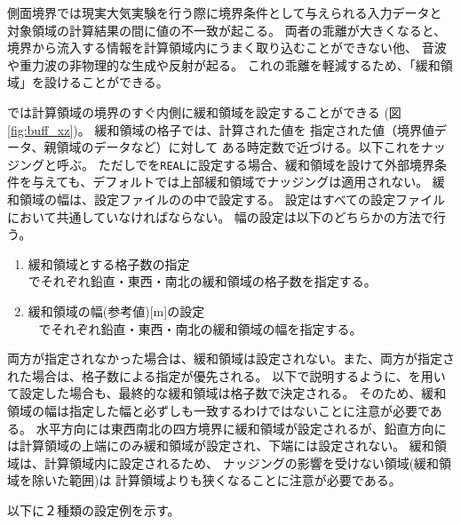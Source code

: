 側面境界では現実大気実験を行う際に境界条件として与えられる入力データと
対象領域の計算結果の間に値の不一致が起こる。
両者の乖離が大きくなると、境界から流入する情報を計算領域内にうまく取り込むことができない他、
音波や重力波の非物理的な生成や反射が起る。
これの乖離を軽減するため、「緩和領域」を設けることができる。

\scalerm では計算領域の境界のすぐ内側に緩和領域を設定することができる
(図\ref{fig:buff_xz})。
緩和領域の格子では、計算された値を
指定された値（境界値データ、親領域のデータなど）に対して
ある時定数で近づける。以下これをナッジングと呼ぶ。
ただしでを\verb|REAL|に設定する場合、緩和領域を設けて外部境界条件を与えても、デフォルトでは上部緩和領域でナッジングは適用されない。
緩和領域の幅は、設定ファイルのの中で設定する。
設定はすべての設定ファイルにおいて共通していなければならない。
幅の設定は以下のどちらかの方法で行う。

\begin{enumerate}
\item 緩和領域とする格子数の指定\\
   でそれぞれ鉛直・東西・南北の緩和領域の格子数を指定する。
\item 緩和領域の幅(参考値)[m]の設定\\\
   でそれぞれ鉛直・東西・南北の緩和領域の幅を指定する。
\end{enumerate}
両方が指定されなかった場合は、緩和領域は設定されない。また、両方が指定された場合は、格子数による指定が優先される。
以下で説明するように、を用いて設定した場合も、最終的な緩和領域は格子数で決定される。
そのため、緩和領域の幅は指定した幅と必ずしも一致するわけではないことに注意が必要である。
水平方向には東西南北の四方境界に緩和領域が設定されるが、鉛直方向には計算領域の上端にのみ緩和領域が設定され、下端には設定されない。
緩和領域は、計算領域内に設定されるため、
ナッジングの影響を受けない領域(緩和領域を除いた範囲)は
計算領域よりも狭くなることに注意が必要である。

以下に２種類の設定例を示す。\\

\\

